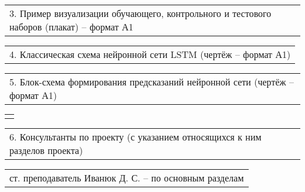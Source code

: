 \documentclass[12pt, А4, twoside]{article}
\begin{document}
\begin{FlushLeft}
    \vspace{-0.1 cm}
    
    \begin{tabular}{p{17.25cm}} 
        \hspace{0.3cm} \textsf{3. Пример визуализации обучающего, контрольного и тестового наборов (плакат) {--} формат А1} \vspace{0pt} \hline  \\
    \end{tabular} 

    \vspace{-0.1 cm}

    \begin{tabular}{p{17.25cm}} 
        \hspace{0.3cm} \textsf{4. Классическая схема нейронной сети LSTM (чертёж {--} формат А1)} \vspace{0pt} \hline  \\
    \end{tabular} 

    \vspace{-0.1 cm}

    \begin{tabular}{p{17.25cm}} 
        \hspace{0.3cm} \textsf{5. Блок-схема формирования предсказаний нейронной сети (чертёж {--} формат А1)} \vspace{0pt} \hline  \\
    \end{tabular} 

    \vspace{-0.1 cm}

    \begin{tabular}{p{17.25cm}} 
        \vspace{0pt} \hline  \\
    \end{tabular}

    \vspace{-0.1 cm}

    \begin{tabular}{p{17.25cm}}
        \textsf{6. Консультанты по проекту (с указанием относящихся к ним разделов проекта)} \vspace{0pt} \hline \\
    \end{tabular}

    \vspace{-0.1 cm}

    \begin{tabular}{p{17.25cm}} 
        \hspace{0.3cm} \textsf{ст. преподаватель Иванюк Д. С. {--} по основным разделам} \vspace{0pt} \hline \\
    \end{tabular}


\end{FlushLeft}
\end{document}
